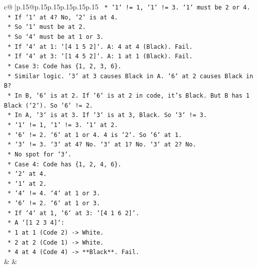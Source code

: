 \documentclass{article}
\begin{document}
{\begin{supertabular}{c@{$\;$}|p{.15\linewidth}@{}p{.15\linewidth}p{.15\linewidth}p{.15\linewidth}p{.15\linewidth}p{.15\linewidth}}
{{{\texttt{        *   `1` != 1, `1` != 3. `1` must be 2 or 4.} \\
\texttt{        *   If `1` at 4? No, `2` is at 4.} \\
\texttt{        *   So `1` must be at 2.} \\
\texttt{        *   So `4` must be at 1 or 3.} \\
\texttt{        *   If `4` at 1: `{[}4 1 5 2{]}`. A: 4 at 4 (Black). Fail.} \\
\texttt{        *   If `4` at 3: `{[}1 4 5 2{]}`. A: 1 at 1 (Black). Fail.} \\
\texttt{    *   Case 3: Code has \{1, 2, 3, 6\}.} \\
\texttt{        *   Similar logic. `3` at 3 causes Black in A. `6` at 2 causes Black in B?} \\
\texttt{        *   In B, `6` is at 2. If `6` is at 2 in code, it's Black. But B has 1 Black (`2`). So `6` != 2.} \\
\texttt{        *   In A, `3` is at 3. If `3` is at 3, Black. So `3` != 3.} \\
\texttt{        *   `1` != 1, `1` != 3. `1` at 2.} \\
\texttt{        *   `6` != 2. `6` at 1 or 4. 4 is `2`. So `6` at 1.} \\
\texttt{        *   `3` != 3. `3` at 4? No. `3` at 1? No. `3` at 2? No.} \\
\texttt{        *   No spot for `3`.} \\
\texttt{    *   Case 4: Code has \{1, 2, 4, 6\}.} \\
\texttt{        *   `2` at 4.} \\
\texttt{        *   `1` at 2.} \\
\texttt{        *   `4` != 4. `4` at 1 or 3.} \\
\texttt{        *   `6` != 2. `6` at 1 or 3.} \\
\texttt{        *   If `4` at 1, `6` at 3: `{[}4 1 6 2{]}`.} \\
\texttt{            *   A `{[}1 2 3 4{]}`:} \\
\texttt{                *   1 at 1 (Code 2) {-}> White.} \\
\texttt{                *   2 at 2 (Code 1) {-}> White.} \\
\texttt{                *   4 at 4 (Code 4) {-}> **Black**. Fail.} \\
            }
        }
    }
    & & \\ \\


\end{supertabular}}
\end{document}
